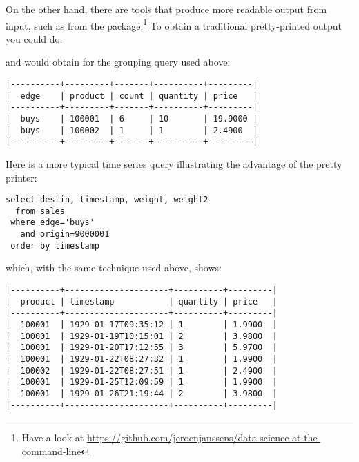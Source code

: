 
On the other hand, there are tools that
produce more readable output from  input,
such as  from the  package.\footnote{Have
a look at
\url{https://github.com/jeroenjanssens/data-science-at-the-command-line}}
To obtain a traditional pretty-printed output you could do:


and would obtain for the grouping query used above:

\begin{verbatim}
|----------+---------+-------+----------+---------|
|  edge    | product | count | quantity | price   |
|----------+---------+-------+----------+---------|
|  buys    | 100001  | 6     | 10       | 19.9000 |
|  buys    | 100002  | 1     | 1        | 2.4900  |
|----------+---------+-------+----------+---------|
\end{verbatim}

Here is a more typical time series query illustrating
the advantage of the pretty printer:

\begin{sqlcode}
\begin{lstlisting}
select destin, timestamp, weight, weight2
  from sales 
 where edge='buys' 
   and origin=9000001 
 order by timestamp
\end{lstlisting}
\end{sqlcode}

which, with the same technique used above, shows:

\begin{verbatim}
|----------+---------------------+----------+---------|
|  product | timestamp           | quantity | price   |
|----------+---------------------+----------+---------|
|  100001  | 1929-01-17T09:35:12 | 1        | 1.9900  |
|  100001  | 1929-01-19T10:15:01 | 2        | 3.9800  |
|  100001  | 1929-01-20T17:12:55 | 3        | 5.9700  |
|  100001  | 1929-01-22T08:27:32 | 1        | 1.9900  |
|  100002  | 1929-01-22T08:27:51 | 1        | 2.4900  |
|  100001  | 1929-01-25T12:09:59 | 1        | 1.9900  |
|  100001  | 1929-01-26T21:19:44 | 2        | 3.9800  |
|----------+---------------------+----------+---------|
\end{verbatim}

